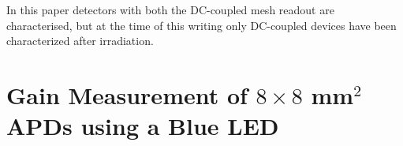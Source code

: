 \documentclass{article}
\begin{document}
In this paper detectors with both the DC-coupled mesh readout are characterised, but at the time of this writing only DC-coupled devices have been characterized after irradiation. 





\section{Gain Measurement of $8 \times 8$ mm$^2$ APDs using a Blue LED}
\label{sec:gain8x8led}
\end{document}
